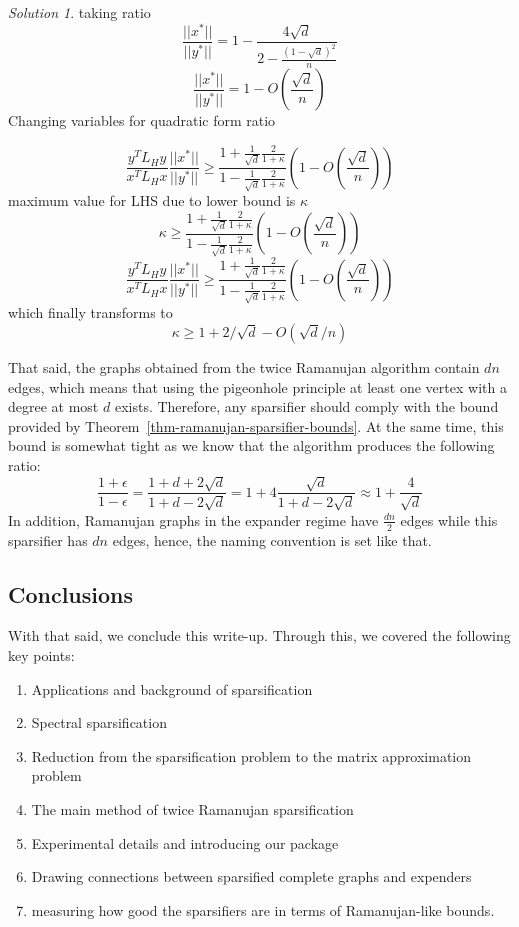 \documentclass[
  letterpaper,
  DIV=11,
  numbers=noendperiod]{scrartcl}
\providecommand{\tightlist}{%
  \setlength{\itemsep}{0pt}\setlength{\parskip}{0pt}}\usepackage{longtable,booktabs,array}
\theoremstyle{plain}
\theoremstyle{plain}
\theoremstyle{plain}
\theoremstyle{definition}
\theoremstyle{plain}
\theoremstyle{remark}
\newtheorem*{solution}{Solution}
\begin{document}
\begin{solution}
taking ratio
\[\frac{||x^*||}{||y^*||} = 1- \frac{4\sqrt{d}}{2-\frac{(1-\sqrt{d})^2}{n}}
\] \[
\frac{||x^*||}{||y^*||} = 1- O(\frac{\sqrt{d}}{n})
\] Changing variables for quadratic form ratio

\[\frac{y^TL_Hy}{x^TL_Hx}\frac{||x^*||}{||y^*||}\geq \frac{1+\frac{1}{\sqrt{d}}\frac{2}{1+\kappa}}{1-\frac{1}{\sqrt{d}}\frac{2}{1+\kappa}}(1- O(\frac{\sqrt{d}}{n}))
\] maximum value for LHS due to lower bound is \(\kappa\)
\[\kappa\geq \frac{1+\frac{1}{\sqrt{d}}\frac{2}{1+\kappa}}{1-\frac{1}{\sqrt{d}}\frac{2}{1+\kappa}}(1- O(\frac{\sqrt{d}}{n}))
\]
\[\frac{y^TL_Hy}{x^TL_Hx}\frac{||x^*||}{||y^*||}\geq \frac{1+\frac{1}{\sqrt{d}}\frac{2}{1+\kappa}}{1-\frac{1}{\sqrt{d}}\frac{2}{1+\kappa}}(1- O(\frac{\sqrt{d}}{n}))
\] which finally transforms to \[
\kappa \geq 1+2/\sqrt{d}-O(\sqrt{d}/n)
\]

\end{solution}

That said, the graphs obtained from the twice Ramanujan algorithm
contain \(dn\) edges, which means that using the pigeonhole principle at
least one vertex with a degree at most \(d\) exists. Therefore, any
sparsifier should comply with the bound provided by
Theorem~\ref{thm-ramanujan-sparsifier-bounds}. At the same time, this
bound is somewhat tight as we know that the algorithm produces the
following ratio:
\[\frac{1 + \epsilon}{1 - \epsilon} = \frac{1 + d + 2 \sqrt{d}}{1 + d - 2 \sqrt{d}} =1 + 4\frac{\sqrt{d}}{1 + d - 2\sqrt{d}} \approx 1 + \frac{4}{\sqrt{d}}\]
In addition, Ramanujan graphs in the expander regime have
\(\frac{dn}{2}\) edges while this sparsifier has \(dn\) edges, hence,
the naming convention is set like that.

\hypertarget{conclusions}{%
\subsection{Conclusions}\label{conclusions}}

With that said, we conclude this write-up. Through this, we covered the
following key points:

\begin{enumerate}
\def\labelenumi{\arabic{enumi}.}
\tightlist
\item
  Applications and background of sparsification
\item
  Spectral sparsification
\item
  Reduction from the sparsification problem to the matrix approximation
  problem
\item
  The main method of twice Ramanujan sparsification
\item
  Experimental details and introducing our package
\item
  Drawing connections between sparsified complete graphs and expenders
\item
  measuring how good the sparsifiers are in terms of Ramanujan-like
  bounds.
\end{enumerate}
\newpage
\end{document}
